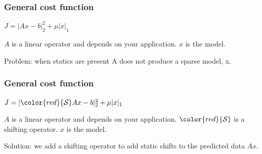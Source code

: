 
\begin{frame} \frametitle{General cost function}
    \Large{$J = |Ax-b|^2_2 + \mu|x|_1 $}

\bigskip

\bigskip
$A$ is a linear operator and depends on your application.
$x$ is the model.
\bigskip

\bigskip
{\color{red}Problem: when statics are present A does not produce a sparse model, x.}

\end{frame}

\begin{frame} \frametitle{General cost function}
    \Large{$J = |{\color{red}{\cal{S}}}Ax-b|^2_2 + \mu|x|_1 $}

\bigskip

\bigskip
$A$ is a linear operator and depends on your application.
${\color{red}{\cal{S}}}$ is a shifting operator.
$x$ is the model.
\bigskip

\bigskip
{\color{red}Solution: we add a shifting operator to add static shifts to the predicted data $Ax$.} 

\end{frame}



